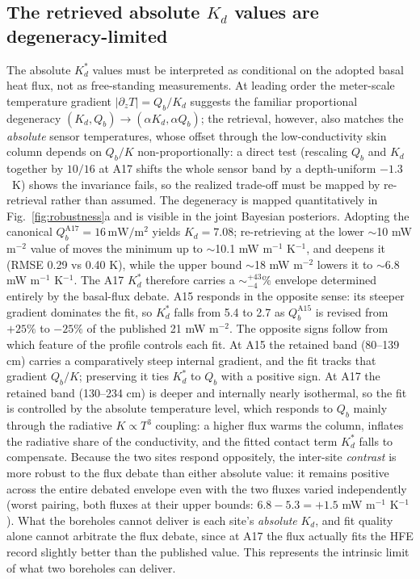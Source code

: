 \documentclass[11pt]{article}
\begin{document}
\subsection{The retrieved absolute $K_d$ values are degeneracy-limited}%
\label{sec:disc-degeneracy}
The absolute $K_d^{*}$ values must be interpreted as conditional on the
adopted basal heat flux, not as free-standing measurements. At leading order the meter-scale
temperature gradient $|\partial_z T|=Q_b/K_d$ suggests the familiar
proportional degeneracy $(K_d,Q_b)\!\to\!(\alpha K_d,\alpha Q_b)$; the
retrieval, however, also matches the \emph{absolute} sensor temperatures,
whose offset through the low-conductivity skin column depends on $Q_b/K$
non-proportionally: a direct test (rescaling $Q_b$ and $K_d$ together
by $10/16$ at A17 shifts the whole sensor band by a depth-uniform
$-1.3$~K) shows the invariance fails, so the realized trade-off must be
mapped by re-retrieval rather than assumed. The degeneracy is mapped
quantitatively in Fig.~\ref{fig:robustness}a and is visible in the joint
Bayesian posteriors. Adopting the canonical
$Q_b^{\mathrm{A17}}=16\,\si{\milli\watt\per\meter\squared}$
\citep{langseth1976,nagihara2018} yields $K_d=7.08$;
re-retrieving at the
lower $\sim$10 mW m$^{-2}$ value of \citet{saito2007,nagihara2018} moves
the minimum up to $\sim$10.1 mW m$^{-1}$ K$^{-1}$, and deepens
it (RMSE 0.29 vs 0.40 K), while the upper bound $\sim$18 mW m$^{-2}$
lowers it to $\sim$6.8 mW m$^{-1}$ K$^{-1}$.
The A17 $K_d^{*}$ therefore carries a
$\sim$$^{+43}_{-4}\%$ envelope determined
entirely by the basal-flux debate. A15
responds in the opposite sense: its steeper gradient dominates
the fit, so $K_d^{*}$ falls from 5.4 to 2.7 as $Q_b^{\mathrm{A15}}$ is
revised from $+25\%$ to $-25\%$ of the published 21 mW m$^{-2}$.
The opposite signs follow from which feature of the profile controls
each fit. At A15 the retained band (80--139 cm) carries a comparatively
steep internal gradient, and the fit tracks that gradient $Q_b/K$;
preserving it ties $K_d^{*}$ to $Q_b$ with a positive sign. At A17 the
retained band (130--234 cm) is deeper and internally nearly isothermal,
so the fit is controlled by the absolute temperature level, which
responds to $Q_b$ mainly through the radiative $K\propto T^{3}$
coupling: a higher flux warms the column, inflates the radiative share
of the conductivity, and the fitted contact term $K_d^{*}$ falls to
compensate. Because
the two sites respond oppositely, the inter-site \emph{contrast} is more
robust to the flux debate than either absolute value: it remains positive
across the entire debated envelope even with the two fluxes varied
independently (worst pairing, both fluxes at their upper bounds: $6.8-5.3=+1.5$ mW m$^{-1}$ K$^{-1}$). What
the boreholes cannot deliver is each site's \emph{absolute} $K_d$, and
fit quality alone cannot arbitrate the flux debate, since at A17 the
\citet{saito2007} flux actually fits the HFE record slightly better than
the published value.
This represents the intrinsic limit of what two boreholes can deliver.
\end{document}
